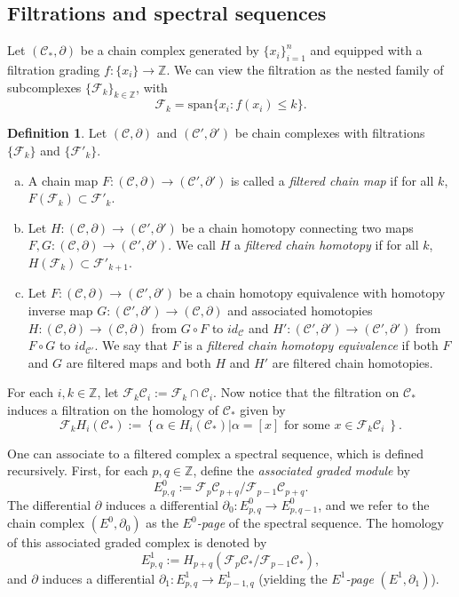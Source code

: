 \documentclass[11pt]{article}
\theoremstyle{plain} \newtheorem{thm}{Theorem}[subsection]
\theoremstyle{plain} \newtheorem{cor}[thm]{Corollary}
\theoremstyle{plain} \newtheorem{prop}[thm]{Proposition}
\theoremstyle{plain} \newtheorem{conj}[thm]{Conjecture}
\theoremstyle{plain} \newtheorem{lem}[thm]{Lemma}
\theoremstyle{definition} \newtheorem{df}[thm]{Definition}
\theoremstyle{remark} \newtheorem{rmk}[thm]{Remark}
\theoremstyle{remark} \newtheorem{obs}[thm]{Observation}
\newcommand{\Ccal}{\mathcal{C}}
\newcommand{\Fcal}{\mathcal{F}}
\newcommand{\del}{\partial}
\begin{document}
\subsection{Filtrations and spectral sequences}\label{sec:filt}

Let $(\Ccal_*, \del)$ be a chain complex generated by $\{ x_{i} \}_{i = 1}^{n}$ and equipped with a filtration grading $f:\{x_{i}\} \rightarrow \mathbb{Z}$.  We can view the filtration as the nested family of subcomplexes $\{ \Fcal_{k} \}_{k \in \mathbb{Z}}$, with
\begin{equation*}
\Fcal_{k} = \text{span}\{ x_{i} : f(x_{i}) \leq k\}.
\end{equation*}

\begin{df}\label{df:fmap}
Let $(\Ccal, \del)$ and $(\Ccal', \del')$ be chain complexes with filtrations $\{ \Fcal_{k} \}$ and $\{ \Fcal'_{k} \}$.
\begin{enumerate}[(a)]
\item A chain map $F: (\Ccal, \del) \rightarrow (\Ccal', \del')$ is called a \textit{filtered chain map} if for all $k$, $F(\Fcal_{k}) \subset \Fcal'_{k}.$
\item Let $H: (\Ccal, \del) \rightarrow (\Ccal', \del')$ be a chain homotopy connecting two maps $F,G:(\Ccal, \del) \rightarrow (\Ccal', \del')$.  We call $H$ a \textit{filtered chain homotopy} if for all $k$, $H(\Fcal_{k}) \subset \Fcal'_{k+1}.$
\item Let $F: (\Ccal, \del) \rightarrow (\Ccal', \del')$ be a chain homotopy equivalence with homotopy inverse map $G: (\Ccal', \del') \rightarrow (\Ccal, \del)$ and associated homotopies $H: (\Ccal, \del) \rightarrow (\Ccal, \del)$ from $G \circ F$ to $id_{\Ccal}$ and $H': (\Ccal', \del') \rightarrow (\Ccal', \del')$ from $F \circ G$ to $id_{\Ccal'}$.  We say that $F$ is a \textit{filtered chain homotopy equivalence} if both $F$ and $G$ are filtered maps and both $H$ and $H'$ are filtered chain homotopies.
\end{enumerate}
\end{df}

For each $i,k \in \mathbb{Z}$, let $\Fcal_k\Ccal_i := \Fcal_k \cap \Ccal_i$.  Now notice that the filtration on $\Ccal_*$ induces a filtration on the homology of $\Ccal_*$ given by
$$ \Fcal_k H_i \left( \Ccal_* \right) :=  \left\{ \alpha \in H_i \left( \Ccal_* \right) \big| \alpha = [x] \text{ for some } x \in \Fcal_k\Ccal_i \ \right\}.$$

One can associate to a filtered complex a spectral sequence, which is defined recursively.  First, for each $p,q \in \mathbb{Z}$, define the \textit{associated graded module} by
$$ E^{0}_{p,q} := \Fcal_p\Ccal_{p+q} / \Fcal_{p-1}\Ccal_{p+q}.$$
The differential $\del$ induces a differential $\del_0: E^0_{p,q} \rightarrow E^0_{p,q-1}$, and we refer to the chain complex $\left( E^0, \del_0  \right)$ as the \textit{$E^0$-page} of the spectral sequence.  The homology of this associated graded complex is denoted by
$$ E^1_{p,q} := H_{p+q} \left( \Fcal_p\Ccal_* / \Fcal_{p-1} \Ccal_*  \right),$$
and $\del$ induces a differential $\del_1: E^1_{p,q} \rightarrow E^1_{p-1,q}$ (yielding the \textit{$E^1$-page} $\left( E^1, \del_1 \right)$).
\end{document}
